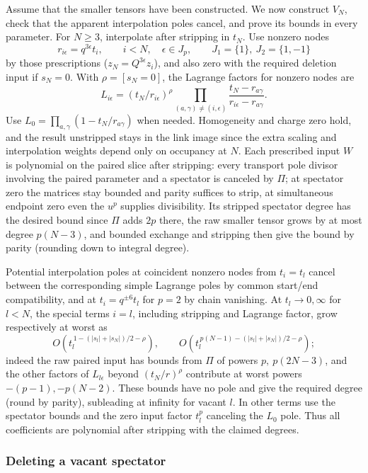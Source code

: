Assume that the smaller tensors have been constructed. We now construct
$V_N$, check that the apparent interpolation poles cancel, and prove its
bounds in every parameter. For \(N\ge3\), interpolate after stripping in
\(t_N\). Use nonzero nodes
\[
 r_{i\epsilon}=q^{3\epsilon}t_i,\qquad i<N,\quad
 \epsilon\in J_p,\qquad J_1=\{1\},\ J_2=\{1,-1\}
\]
by those prescriptions (\(z_N=Q^{3\epsilon}z_i\)), and also zero with the required deletion input if \(s_N=0\). With \(\rho=[s_N=0]\), the Lagrange factors for nonzero nodes are
\[
 L_{i\epsilon}=(t_N/r_{i\epsilon})^\rho
       \prod_{(a,\gamma)\ne(i,\epsilon)}\frac{t_N-r_{a\gamma}}{r_{i\epsilon}-r_{a\gamma}} .
\]
Use \(L_0=\prod_{a,\gamma}(1-t_N/r_{a\gamma})\) when needed. Homogeneity and charge zero hold, and the result unstripped stays in the link image since the extra scaling and interpolation weights depend only on occupancy at \(N\). Each prescribed input \(W\) is polynomial on the paired slice after stripping: every transport pole divisor involving the paired parameter and a spectator is canceled by \(\Pi\); at spectator zero the matrices stay bounded and parity suffices to strip, at simultaneous endpoint zero even the \(u^p\) supplies divisibility. Its stripped spectator degree has the desired bound since \(\Pi\) adds \(2p\) there, the raw smaller tensor grows by at most degree \(p(N-3)\), and bounded exchange and stripping then give the bound by parity (rounding down to integral degree).

Potential interpolation poles at coincident nonzero nodes from \(t_i=t_l\) cancel between the corresponding simple Lagrange poles by common start/end compatibility, and at \(t_i=q^{\pm6}t_l\) for \(p=2\) by chain vanishing. At \(t_l\to0,\infty\) for \(l<N\), the special terms \(i=l\), including stripping and Lagrange factor, grow respectively at worst as
\[
 O(t_l^{\,1-(|s_l|+|s_N|)/2-\rho}),\qquad
 O(t_l^{\,p(N-1)-(|s_l|+|s_N|)/2-\rho});
\]
indeed the raw paired input has bounds from \(\Pi\) of powers \(p,\ p(2N-3)\), and the other factors of \(L_{l\epsilon}\) beyond \((t_N/r)^\rho\) contribute at worst powers \(-(p-1),-p(N-2)\). These bounds have no pole and give the required degree (round by parity), subleading at infinity for vacant \(l\). In other terms use the spectator bounds and the zero input factor \(t_l^p\) canceling the \(L_0\) pole. Thus all coefficients are polynomial after stripping with the claimed degrees.

\subsubsection{Deleting a vacant spectator}

